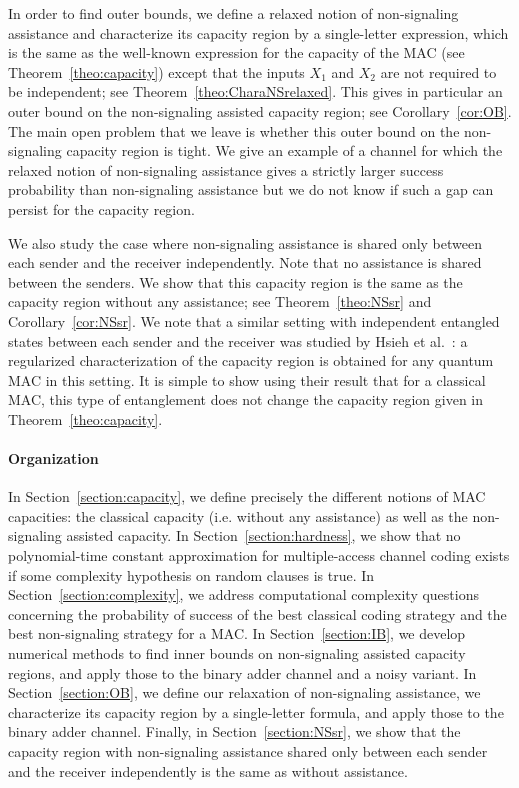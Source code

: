 In order to find outer bounds, we define a relaxed notion of non-signaling assistance and characterize its capacity region by a single-letter expression, which is the same as the well-known expression for the capacity of the MAC (see Theorem~\ref{theo:capacity}) except that the inputs $X_1$ and $X_2$ are not required to be independent; see Theorem~\ref{theo:CharaNSrelaxed}. This gives in particular an outer bound on the non-signaling assisted capacity region; see Corollary~\ref{cor:OB}. The main open problem that we leave is whether this outer bound on the non-signaling capacity region is tight. We give an example of a channel for which the relaxed notion of non-signaling assistance gives a strictly larger success probability than non-signaling assistance but we do not know if such a gap can persist for the capacity region.

We also study the case where non-signaling assistance is shared only between each sender and the receiver independently. Note that no assistance is shared between the senders. We show that this capacity region is the same as the capacity region without any assistance; see Theorem~\ref{theo:NSsr} and Corollary~\ref{cor:NSsr}. We note that a similar setting with independent entangled states between each sender and the receiver was studied by Hsieh et al.~\cite{HDW08}: a regularized characterization of the capacity region is obtained for any quantum MAC in this setting. It is simple to show using their result that for a classical MAC, this type of entanglement does not change the capacity region given in Theorem~\ref{theo:capacity}.

\paragraph{Organization} In Section~\ref{section:capacity}, we define precisely the different notions of MAC capacities: the classical capacity (i.e. without any assistance) as well as the non-signaling assisted capacity. In Section~\ref{section:hardness}, we show that no polynomial-time constant approximation for multiple-access channel coding exists if some complexity hypothesis on random clauses is true. In Section~\ref{section:complexity}, we address computational complexity questions concerning the probability of success of the best classical coding strategy and the best non-signaling strategy for a MAC. In Section~\ref{section:IB}, we develop numerical methods to find inner bounds on non-signaling assisted capacity regions, and apply those to the binary adder channel and a noisy variant. In Section~\ref{section:OB}, we define our relaxation of non-signaling assistance, we characterize its capacity region by a single-letter formula, and apply those to the binary adder channel. Finally, in Section~\ref{section:NSsr}, we show that the capacity region with non-signaling assistance shared only between each sender and the receiver independently is the same as without assistance.

